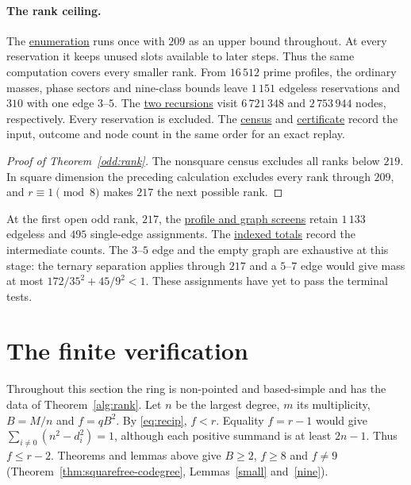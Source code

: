 \documentclass[11pt]{amsart}
\numberwithin{equation}{section}
\theoremstyle{definition}
\theoremstyle{plain}
\newcommand{\supfile}[2]{\href{run:rank-bound-supplement/#1}{#2}}
\begin{document}
\paragraph{The rank ceiling.}
The \supfile{odd_square/profiles.py}{enumeration} runs once with $209$
as an upper bound throughout. At every reservation it keeps unused slots
available to later steps. Thus the same computation covers every smaller
rank. From $16\,512$ prime profiles, the ordinary masses, phase sectors and
nine-class bounds leave $1\,151$ edgeless reservations and $310$ with
one edge $3$--$5$. The
\supfile{odd_square/check.py}{two recursions}
visit $6\,721\,348$ and $2\,753\,944$ nodes, respectively. Every
reservation is excluded. The \supfile{odd_square/census.json}{census}
and \supfile{odd_square/certificate.json}{certificate} record the input,
outcome and node count in the same order for an exact replay.

\begin{proof}[Proof of Theorem~\ref{odd:rank}]
The nonsquare census excludes all ranks below $219$. In square dimension
the preceding calculation excludes every rank through $209$, and
$r\equiv1\pmod8$ makes $217$ the next possible rank.
\end{proof}

At the first open odd rank, $217$, the
\supfile{verification/frontier217/check.py}{profile and graph screens}
retain $1\,133$ edgeless and $495$ single-edge assignments. The
\supfile{verification/frontier217/graphs.json}{indexed totals}
record the intermediate counts.
The $3$--$5$ edge and the empty graph are exhaustive at this stage:
the ternary separation applies through $217$ and a $5$--$7$ edge
would give mass at most $172/35^2+45/9^2<1$.
These assignments have yet to pass the terminal tests.


\section{The finite verification}\label{sec:verify}

Throughout this section the ring is non-pointed and based-simple and
has the data of Theorem~\ref{alg:rank}. Let $n$ be
the largest degree, $m$ its multiplicity, $B=M/n$ and $f=qB^2$.
By \eqref{eq:recip}, $f<r$. Equality $f=r-1$ would give
$\sum_{i\ne0}(n^2-d_i^2)=1$, although each positive summand is at
least $2n-1$. Thus $f\le r-2$. Theorems and lemmas above give $B\ge2$,
$f\ge8$ and $f\ne9$
(Theorem~\ref{thm:squarefree-codegree}, Lemmas~\ref{small} and~\ref{nine}).
\end{document}
